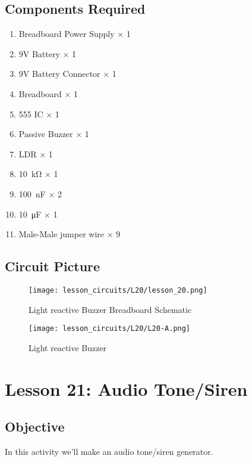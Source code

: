\subsection{Components Required}
\begin{enumerate}
    \item Breadboard Power Supply $\times$ 1
    \item 9V Battery $\times$ 1
    \item 9V Battery Connector $\times$ 1
    \item Breadboard $\times$ 1
    \item 555 IC $\times$ 1
    \item Passive Buzzer $\times$ 1
    \item LDR $\times$ 1
    \item \SI{10}{\kilo\ohm} $\times$ 1
    \item \SI{100}{\nano\farad} $\times$ 2
    \item \SI{10}{\micro\farad} $\times$ 1
    \item Male-Male jumper wire $\times$ 9
\end{enumerate}
\subsection{Circuit Picture}
\begin{figure}[!hp]
    \centering
    \texttt{[image: lesson\_circuits/L20/lesson\_20.png]}
    \caption{Light reactive Buzzer Breadboard Schematic}
    \label{fig:555_ldrbuzz_sch}
\end{figure}
\begin{figure}[!hp]
    \centering
    \texttt{[image: lesson\_circuits/L20/L20-A.png]}
    \caption{Light reactive Buzzer}
    \label{fig:555_ldrbuzz_obb}
\end{figure}
\section{Lesson 21: Audio Tone/Siren}
\subsection{Objective}
In this activity we'll make an audio tone/siren generator.
